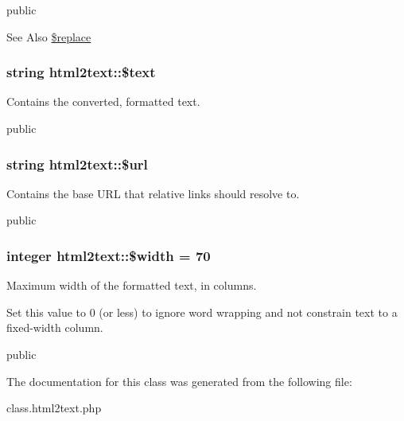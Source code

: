 public \begin{DoxySeeAlso}{See Also}
\hyperlink{classhtml2text_ab84fb8261392ce0f0d329dbffd0dc848}{\$replace} 
\end{DoxySeeAlso}
\hypertarget{classhtml2text_a9f893148949046a51cefad452e88f4ab}{
\subsubsection[{\$text}]{\setlength{\rightskip}{0pt plus 5cm}string html2text\-::\$text}}\label{classhtml2text_a9f893148949046a51cefad452e88f4ab}
Contains the converted, formatted text.

public \hypertarget{classhtml2text_a2064bd23eca4e7eeb207ba23ca91613b}{
\subsubsection[{\$url}]{\setlength{\rightskip}{0pt plus 5cm}string html2text\-::\$url}}\label{classhtml2text_a2064bd23eca4e7eeb207ba23ca91613b}
Contains the base U\-R\-L that relative links should resolve to.

public \hypertarget{classhtml2text_a69cdbc42dd33f4215e4a655adaf24989}{
\subsubsection[{\$width}]{\setlength{\rightskip}{0pt plus 5cm}integer html2text\-::\$width = 70}}\label{classhtml2text_a69cdbc42dd33f4215e4a655adaf24989}
Maximum width of the formatted text, in columns.

Set this value to 0 (or less) to ignore word wrapping and not constrain text to a fixed-\/width column.

public 

The documentation for this class was generated from the following file\-:\begin{DoxyCompactItemize}
\item 
class.\-html2text.\-php\end{DoxyCompactItemize}
